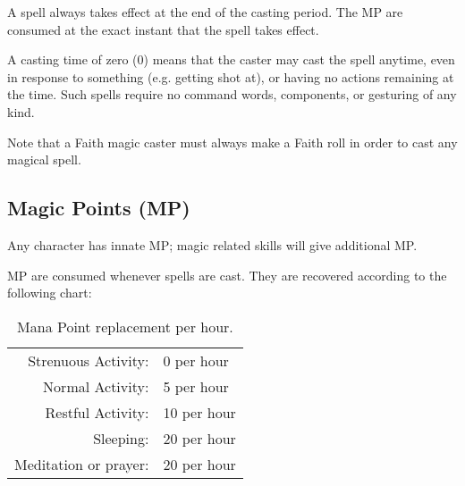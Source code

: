 \documentclass[twoside]{book}
\begin{document}
    {  
     A spell always takes effect at the end of the casting
             period. The MP are consumed at the exact instant that the
             spell takes effect. 
    }
  
    {  
     A casting time of zero (0) means that the caster may
             cast the spell anytime, even in response to something (e.g.
             getting shot at), or having no actions remaining at the
             time. Such spells require no command words, components, or
             gesturing of any kind. 
    }
  
    {  
     Note that a Faith magic caster must always make a
             Faith roll in order to cast any magical spell. 
    }
  
    

\subsection{Magic Points (MP)}
    
    {  
     Any character has innate MP; magic related skills
               will give additional MP. 
    }
  
    {  
     MP are consumed whenever spells are cast. They are
               recovered according to the following chart: 
    }
  
\begin{table}[!htb]
  \begin{center}

  \begin{tabular}{|r|l|}
  \hline
\textscbf{}&\textscbf{}\\
  \hline
  \hline
       Strenuous Activity: & 0 per hour \\

\hline Normal Activity: & 5 per hour \\

\hline Restful Activity: & 10 per hour \\

\hline Sleeping: & 20 per hour \\

\hline Meditation or prayer: & 20 per hour \\

\hline
  \end{tabular}
  
\caption{Mana Point replacement per hour.}
  
  \end{center}
\end{table}
  
\end{document}
